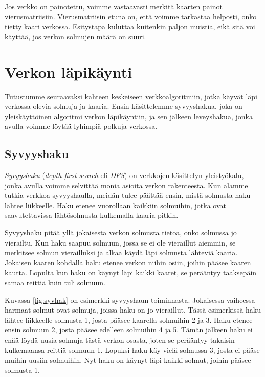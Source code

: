 Jos verkko on painotettu, voimme vastaavasti merkitä
kaarten painot vierusmatriisiin.
Vierusmatriisin etuna on, että voimme tarkastaa helposti,
onko tietty kaari verkossa.
Esitystapa kuluttaa kuitenkin paljon muistia,
eikä sitä voi käyttää, jos verkon solmujen määrä on suuri.

\section{Verkon läpikäynti}

Tutustumme seuraavaksi kahteen keskeiseen verkkoalgoritmiin,
jotka käyvät läpi verkossa olevia solmuja ja kaaria.
Ensin käsittelemme syvyyshakua, joka on yleiskäyttöinen algoritmi
verkon läpikäyntiin, ja sen jälkeen leveyshakua,
jonka avulla voimme löytää lyhimpiä polkuja verkossa.

\subsection{Syvyyshaku}


\emph{Syvyyshaku} (\emph{depth-first search} eli \emph{DFS})
on verkkojen käsittelyn yleistyökalu,
jonka avulla voimme selvittää monia asioita verkon rakenteesta.
Kun alamme tutkia verkkoa syvyyshaulla,
meidän tulee päättää ensin, mistä solmusta haku lähtee liikkeelle.
Haku etenee vuorollaan kaikkiin solmuihin, jotka ovat saavutettavissa
lähtösolmusta kulkemalla kaaria pitkin.

Syvyyshaku pitää yllä jokaisesta verkon solmusta tietoa,
onko solmussa jo vierailtu.
Kun haku saapuu solmuun, jossa se ei ole vieraillut aiemmin,
se merkitsee solmun vierailluksi ja alkaa käydä
läpi solmusta lähteviä kaaria.
Jokaisen kaaren kohdalla haku etenee verkon niihin osiin,
joihin pääsee kaaren kautta.
Lopulta kun haku on käynyt läpi kaikki kaaret,
se perääntyy taaksepäin samaa reittiä kuin tuli solmuun.

Kuvassa \ref{fig:syvhak} on esimerkki syvyyshaun toiminnasta.
Jokaisessa vaiheessa harmaat solmut ovat solmuja,
joissa haku on jo vieraillut.
Tässä esimerkissä haku lähtee liikkeelle solmusta 1,
josta pääsee kaarella solmuihin 2 ja 3.
Haku etenee ensin solmuun 2, josta pääsee edelleen
solmuihin 4 ja 5.
Tämän jälkeen haku ei enää löydä uusia solmuja
tästä verkon osasta, joten se perääntyy takaisin
kulkemaansa reittiä solmuun 1.
Lopuksi haku käy vielä solmussa 3,
josta ei pääse muihin uusiin solmuihin.
Nyt haku on käynyt läpi kaikki solmut,
joihin pääsee solmusta 1.

